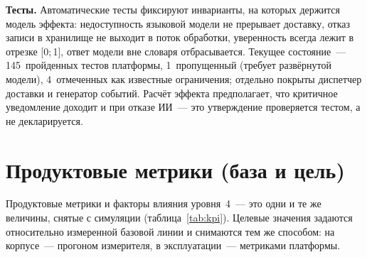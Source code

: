 \documentclass[utf8x, 12pt]{G7-32} %
\begin{document}
\textbf{Тесты.} Автоматические тесты фиксируют инварианты, на которых держится
модель эффекта: недоступность языковой модели не прерывает доставку, отказ
записи в хранилище не выходит в поток обработки, уверенность всегда лежит в
отрезке [0;\,1], ответ модели вне словаря отбрасывается. Текущее состояние~---
145~пройденных тестов платформы, 1~пропущенный (требует развёрнутой модели),
4~отмеченных как известные ограничения; отдельно покрыты диспетчер доставки и
генератор событий. Расчёт эффекта предполагает, что критичное уведомление
доходит и при отказе ИИ~--- это утверждение проверяется тестом, а не
декларируется.

\section{Продуктовые метрики (база и цель)}
Продуктовые метрики и факторы влияния уровня~4~--- это одни и те же величины,
снятые с симуляции (таблица~\ref{tab:kpi}). Целевые значения задаются
относительно измеренной базовой линии и снимаются тем же способом:
на корпусе~--- прогоном измерителя, в эксплуатации~--- метриками платформы.

\begin{table}[H]
\centering
\caption{Продуктовые метрики: базовое и целевое значения}
\label{tab:kpi}
\end{table}
\end{document}
